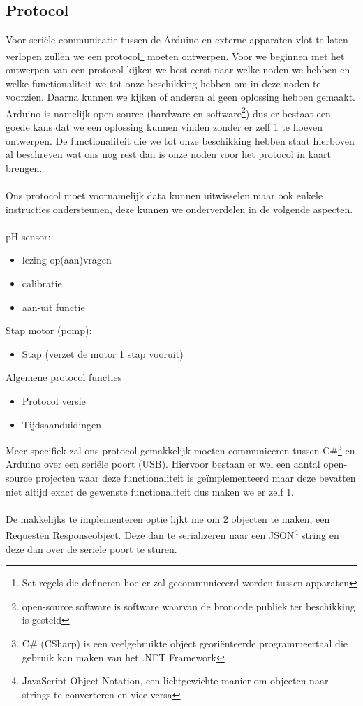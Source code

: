 \documentclass[10pt,twoside]{report}
\begin{document}
\subsection{Protocol}
Voor seriële communicatie tussen de Arduino en externe apparaten vlot te laten verlopen zullen we een protocol\footnote{Set regels die defineren hoe er zal gecommuniceerd worden tussen apparaten} moeten ontwerpen. 
Voor we beginnen met het ontwerpen van een protocol kijken we best eerst naar welke noden we hebben en welke functionaliteit we tot onze beschikking hebben om in deze noden te voorzien. Daarna kunnen we kijken of anderen al geen oplossing hebben gemaakt. Arduino is namelijk open-source (hardware en software\footnote{open-source software is software waarvan de broncode publiek ter beschikking is gesteld}) dus er bestaat een goede kans dat we een oplossing kunnen vinden zonder er zelf 1 te hoeven ontwerpen. De functionaliteit die we tot onze beschikking hebben staat hierboven al beschreven wat ons nog rest dan is onze noden voor het protocol in kaart brengen.
\\\\
Ons protocol moet voornamelijk data kunnen uitwisselen maar ook enkele instructies ondersteunen, deze kunnen we onderverdelen in de volgende aspecten.
\\\\
pH sensor:
\begin{itemize}
    \item lezing op(aan)vragen
    \item calibratie
    \item aan-uit functie
\end{itemize}
Stap motor (pomp):
\begin{itemize}
    \item Stap (verzet de motor 1 stap vooruit)
\end{itemize}
Algemene protocol functies
\begin{itemize}
    \item Protocol versie
    \item Tijdsaanduidingen
\end{itemize}
Meer specifiek zal ons protocol gemakkelijk moeten communiceren tussen C\#\footnote{C\# (CSharp) is een veelgebruikte object georiënteerde programmeertaal die gebruik kan maken van het .NET Framework} en Arduino over een seriële poort (USB). Hiervoor bestaan er wel een aantal open-source projecten waar deze functionaliteit is geïmplementeerd maar deze bevatten niet altijd exact de gewenste functionaliteit dus maken we er zelf 1.\\\\
De makkelijks te implementeren optie lijkt me om 2 objecten te maken, een \"Request\" en \"Response\" object. Deze dan te serializeren naar een JSON\footnote{JavaScript Object Notation, een lichtgewichte manier om objecten naar strings te converteren en vice versa} string en deze dan over de seriële poort te sturen.
\end{document}
